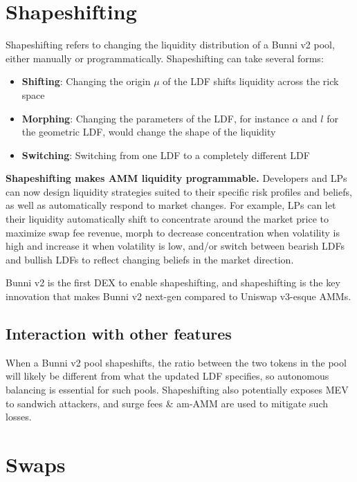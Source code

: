 \documentclass[twocolumn]{article}
\begin{document}
\section{Shapeshifting} 

Shapeshifting refers to changing the liquidity distribution of a Bunni v2 pool, either manually or programmatically. Shapeshifting can take several forms:

\begin{itemize}
  \item \textbf{Shifting}: Changing the origin $\mu$ of the LDF shifts liquidity across the rick space
  \item \textbf{Morphing}: Changing the parameters of the LDF, for instance $\alpha$ and $l$ for the geometric LDF, would change the shape of the liquidity 
  \item \textbf{Switching}: Switching from one LDF to a completely different LDF
\end{itemize}

\textbf{Shapeshifting makes AMM liquidity programmable.} Developers and LPs can now design liquidity strategies suited to their specific risk profiles and beliefs, as well as automatically respond to market changes. For example, LPs can let their liquidity automatically shift to concentrate around the market price to maximize swap fee revenue, morph to decrease concentration when volatility is high and increase it when volatility is low, and/or switch between bearish LDFs and bullish LDFs to reflect changing beliefs in the market direction.

Bunni v2 is the first DEX to enable shapeshifting, and shapeshifting is the key innovation that makes Bunni v2 next-gen compared to Uniswap v3-esque AMMs.

\subsection{Interaction with other features}

When a Bunni v2 pool shapeshifts, the ratio between the two tokens in the pool will likely be different from what the updated LDF specifies, so autonomous balancing is essential for such pools. Shapeshifting also potentially exposes MEV to sandwich attackers, and surge fees \& am-AMM are used to mitigate such losses.

\section{Swaps}
\end{document}
